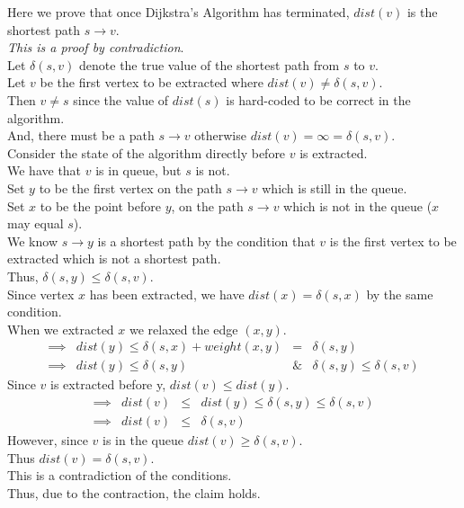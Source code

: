 \documentclass[11pt,a4paper]{article}
\begin{document}
Here we prove that once Dijkstra's Algorithm has terminated, $dist(v)$ is the shortest path $s \to v$.\\
\textit{This is a proof by  contradiction}.\\
Let $\delta(s,v)$ denote the true value of the shortest path from $s$ to $v$.\\
Let $v$ be the first vertex to be extracted where $dist(v)\neq\delta(s,v)$.\\
Then $v\neq s$ since the value of $dist(s)$ is hard-coded to be correct in the algorithm.\\
And, there must be a path $s\to v$ otherwise $dist(v)=\infty=\delta(s,v)$.\\
Consider the state of the algorithm directly before $v$ is extracted.\\
We have that $v$ is in queue, but $s$ is not.\\
Set $y$ to be the first vertex on the path $s\to v$ which is still in the queue.\\
Set $x$ to be the point before $y$, on the path $s\to v$ which is not in the queue ($x$ may equal $s$).\\
We know $s\to y$ is a shortest path by the condition that $v$ is the first vertex to be extracted which is not a shortest path.\\
Thus, $\delta(s,y)\leq\delta(s,v)$.\\
Since vertex $x$ has been extracted, we have $dist(x)=\delta(s,x)$ by the same condition.\\
When we extracted $x$ we relaxed the edge $(x,y)$.
\[\begin{array}{rrcl}
\implies& dist(y)\leq\delta(s,x)+weight(x,y)&=&\delta(s,y)\\
\implies&dist(y)\leq\delta(s,y)
&\&&\delta(s,y)\leq\delta(s,v)
\end{array}\]
Since $v$ is extracted before y, $dist(v)\leq dist(y)$.\\
\[\begin{array}{rrcl}
\implies&dist(v)&\leq&dist(y)\leq\delta(s,y)\leq\delta(s,v)\\
\implies&dist(v)&\leq&\delta(s,v)
\end{array}\]
However, since $v$ is in the queue $dist(v)\geq\delta(s,v)$.\\
Thus $dist(v)=\delta(s,v)$.\\
This is a contradiction of the conditions.\\
Thus, due to the contraction, the claim holds.\\
\end{document}
